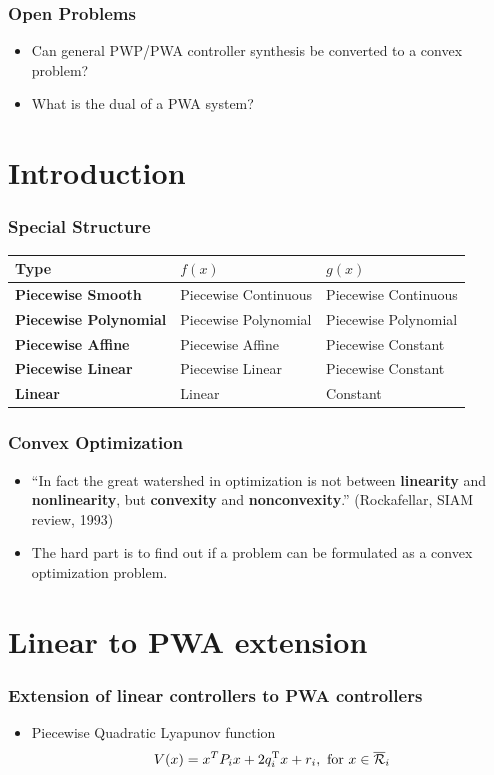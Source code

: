 \documentclass{beamer}
\newcommand{\red}{\color[rgb]{1,0,0}}
\newcommand{\green}{\color[rgb]{0,0.79,0}}
\newcommand{\TR}{\text{T}}
\newcommand{\RR}{{\cal R}}
\newcommand{\beq}{\begin{equation*}}
\newcommand{\eeq}{\end{equation*}}
\begin{document}
  \frame
  {
    \frametitle{Open Problems}
    \begin{itemize}
    \item Can general PWP/PWA controller synthesis be converted to a convex problem?
    \item What is the dual of a PWA system?
    \end{itemize}
}

\section[]{Introduction}

  \frame
  {
    \frametitle{Special Structure}
		\begin{center}
		\begin{tabular}{|l|l|l|}
		\hline
		Type& $f(x)$ & $g(x)$\\\hline
		\textbf{Piecewise Smooth}& Piecewise Continuous & Piecewise Continuous\\\hline
		\textbf{Piecewise Polynomial}& Piecewise Polynomial & Piecewise Polynomial\\\hline
		\textbf{Piecewise Affine}& Piecewise Affine & Piecewise Constant\\\hline
		\textbf{Piecewise Linear}& Piecewise Linear & Piecewise Constant\\\hline
		\textbf{Linear}& Linear & Constant\\\hline
		\end{tabular}
		\end{center}
}

  \frame
  {
    \frametitle{Convex Optimization}
\begin{itemize}
    \item ``In fact the great watershed in optimization is not between \textbf{linearity} and \textbf{nonlinearity}, but \textbf{{\green convexity}} and \textbf{{\red  nonconvexity}}.'' (Rockafellar, SIAM review, 1993)
    \item The hard part is to find out if a problem can be formulated as a convex optimization problem. 
    \end{itemize}
}

\section[]{Linear to PWA extension}
  \frame
  {
\frametitle{Extension of linear controllers to PWA controllers}
\begin{itemize}
\item Piecewise Quadratic Lyapunov function    
\beq
V(x)= x^T P_i x+2q_i^\TR x+r_i, \text{ for }x\in \overline\RR_i
\eeq
\end{itemize}
}
\end{document}
